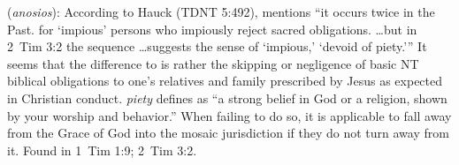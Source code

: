 \item[Impious,]

(\textit{anosios}):
According to Hauck (TDNT 5:492), mentions ``it occurs twice in the Past. for `impious' persons who impiously reject sacred obligations. \ldots but in 2~Tim 3:2 the sequence \ldots suggests the sense of `impious,' `devoid of piety.''' It seems that the difference to  is rather the skipping or negligence of basic NT biblical obligations to one's relatives and family prescribed by Jesus as expected in Christian conduct. \emph{piety} defines as ``a strong belief in God or a religion, shown by your worship and behavior.'' When failing to do so, it is applicable to fall away from the Grace of God into the mosaic jurisdiction if they do not turn away from it.
Found in 1~Tim 1:9; 2~Tim 3:2.
